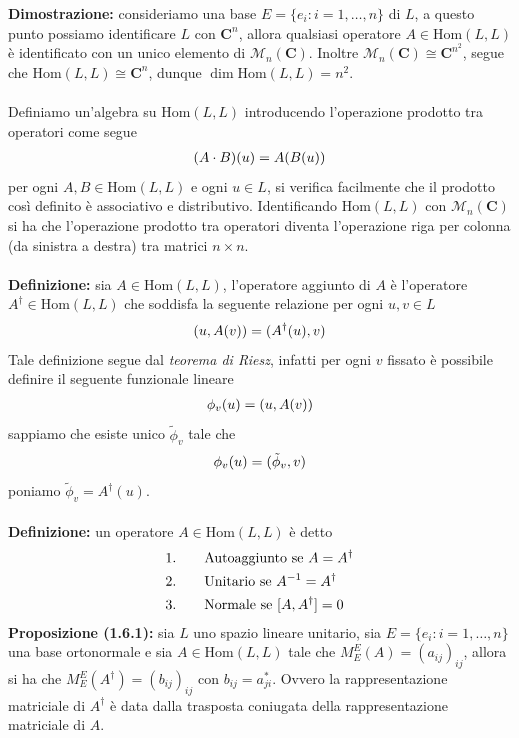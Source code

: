 \documentclass{article}
\begin{document}
\textbf{Dimostrazione:} consideriamo una base $E = \{e_i : i = 1, \dots, n\}$ di $L$, a questo punto possiamo identificare $L$ con $\mathbf{C}^n$, allora qualsiasi operatore $A \in \mathrm{Hom}(L, L)$ è identificato con un unico elemento di $\mathcal{M}_n(\mathbf{C})$. Inoltre $\mathcal{M}_n(\mathbf{C}) \cong \mathbf{C}^{n^2}$, segue che $\mathrm{Hom}(L, L) \cong \mathbf{C}^n$, dunque $\dim \mathrm{Hom}(L, L) = n^2$. \\ \\
Definiamo un'algebra su $\mathrm{Hom}(L,L)$ introducendo l'operazione prodotto tra operatori come segue
\begin{gather}
    (A \cdot B)(u) = A(B(u)) \notag
\end{gather}
per ogni $A, B \in \mathrm{Hom}(L, L)$ e ogni $u \in L$, si verifica facilmente che il prodotto così definito è associativo e distributivo. Identificando $\mathrm{Hom}(L, L)$ con $\mathcal{M}_n(\mathbf{C})$ si ha che l'operazione prodotto tra operatori diventa l'operazione riga per colonna (da sinistra a destra) tra matrici $n \times n$. \\ \\
\textbf{Definizione:} sia $A \in \mathrm{Hom}(L, L)$, l'operatore aggiunto di $A$ è l'operatore $A^\dagger \in \mathrm{Hom}(L, L)$ che soddisfa la seguente relazione per ogni $u, v \in L$
\begin{gather}
    (u, A(v)) = (A^\dagger(u), v) \notag
\end{gather}
Tale definizione segue dal \textit{teorema di Riesz}, infatti per ogni $v$ fissato è possibile definire il seguente funzionale lineare
\begin{gather}
    \phi_v(u) = (u, A(v)) \notag
\end{gather}
sappiamo che esiste unico $\tilde{\phi}_v$ tale che
\begin{gather}
    \phi_v(u) = (\tilde{\phi}_v, v) \notag
\end{gather}
poniamo $\tilde{\phi}_v = A^\dagger(u)$. \\ \\
\textbf{Definizione:} un operatore $A \in \mathrm{Hom}(L, L)$ è detto
\begin{align}
    1. \qquad &\text{Autoaggiunto se } A = A^\dagger \notag \\
    2. \qquad &\text{Unitario se } A^{-1} = A^\dagger \notag \\
    3. \qquad &\text{Normale se } [A, A^\dagger] = 0 \notag
\end{align}
\textbf{Proposizione (1.6.1):} sia $L$ uno spazio lineare unitario, sia $E = \{e_i : i = 1, \dots, n\}$ una base ortonormale e sia $A \in \mathrm{Hom}(L, L)$ tale che $M^E_E(A) = (a_{ij})_{ij}$, allora si ha che $M^E_E(A^\dagger) = (b_{ij})_{ij}$ con $b_{ij} = a^*_{ji}$. Ovvero la rappresentazione matriciale di $A^\dagger$ è data dalla trasposta coniugata della rappresentazione matriciale di $A$. \\
\end{document}
